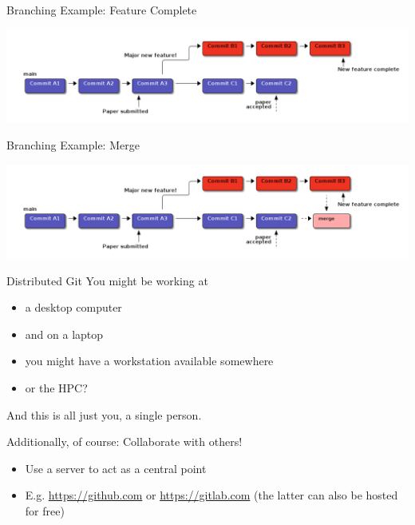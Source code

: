 \documentclass[presentation, smaller, aspectratio=169]{beamer}
\begin{document}
\begin{frame}[label={sec:org30529c3}]{Branching Example: Feature Complete}
\begin{center}
\includegraphics[scale=0.3]{figures/main_branch_060.png}
\label{branching_60_feature_complete}
\end{center}
\end{frame}
\begin{frame}[label={sec:orgd3055bc}]{Branching Example: Merge}
\begin{center}
\includegraphics[scale=0.3]{figures/main_branch_070.png}
\label{branching_70_merge}
\end{center}
\end{frame}
\begin{frame}[label={sec:org162a6bd}]{Distributed Git}
You might be working at
\begin{itemize}
\item a desktop computer
\item and on a laptop
\item you might have a workstation available somewhere
\item or the HPC?
\end{itemize}

And this is all just you, a single person.

Additionally, of course: Collaborate with others!
\begin{itemize}
\item Use a server to act as a central point
\item E.g. \url{https://github.com} or \url{https://gitlab.com}
(the latter can also be hosted for free)
\end{itemize}
\end{frame}
\end{document}
